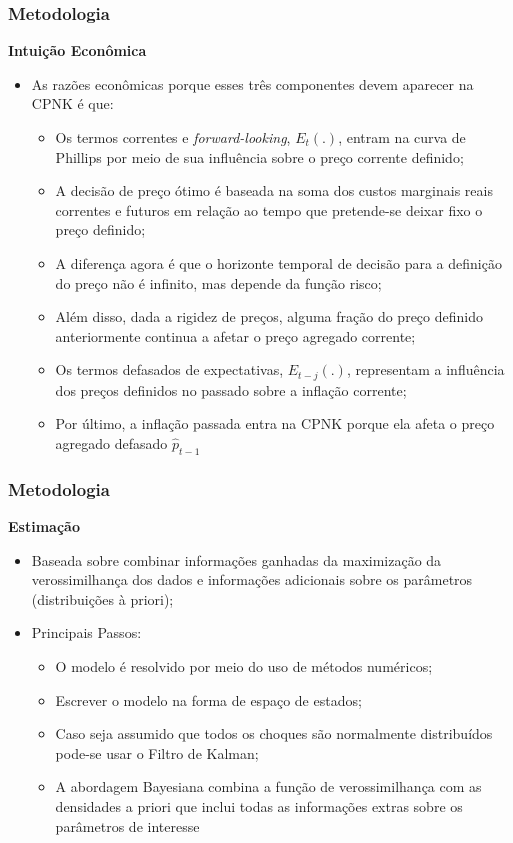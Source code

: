 \documentclass[aspectratio=169]{beamer}
\begin{document}
\begin{frame}\frametitle{Metodologia}
  \textbf{Intuição Econômica}
  \begin{itemize}
  \item As razões econômicas porque esses três componentes devem aparecer na CPNK é que:
    \begin{itemize}
    \item Os termos correntes e \emph{forward-looking}, ${E}_{t}(.)$, entram na curva de Phillips por meio de sua influência sobre o preço corrente definido;
    \item A decisão de preço ótimo é baseada na soma dos custos marginais reais correntes e futuros em relação ao tempo que pretende-se deixar fixo o preço definido;
    \item A diferença agora é que o horizonte temporal de decisão para a definição do preço não é infinito, mas depende da função risco;
    \item Além disso, dada a rigidez de preços, alguma fração do preço definido anteriormente continua a afetar o preço agregado corrente;
    \item Os termos defasados de expectativas, ${E}_{t-j}(.)$, representam a influência dos preços definidos no passado sobre a inflação corrente;
    \item Por último, a inflação passada entra na CPNK porque ela afeta o preço agregado defasado ${ \hat { p }  }_{ t-1 }$
    \end{itemize}
  \end{itemize}
\end{frame}

\begin{frame}\frametitle{Metodologia}
  \textbf{Estimação}
  \begin{itemize}
  \item Baseada sobre combinar informações ganhadas da maximização da verossimilhança dos dados e informações adicionais sobre os parâmetros (distribuições à priori);
  \item Principais Passos:
    \begin{itemize}
    \item O modelo é resolvido por meio do uso de métodos numéricos;
    \item Escrever o modelo na forma de espaço de estados;
    \item Caso seja assumido que todos os choques são normalmente distribuídos pode-se usar o Filtro de Kalman;
    \item A abordagem Bayesiana combina a função de verossimilhança com as densidades a priori que inclui todas as informações extras sobre os parâmetros de interesse
    \end{itemize}
  \end{itemize}
\end{frame}
\end{document}
